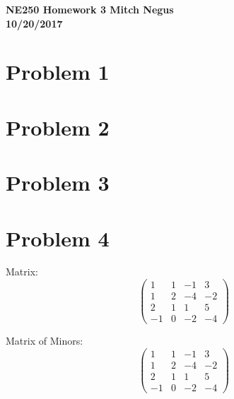 \documentclass{article}
\begin{document}
\thispagestyle{empty}

{\bf {\large {NE250 Homework {3} \hfill Mitch Negus\\
		\hspace*{\fill} 10/20/2017\\ }}}
		
		
		

\section*{Problem 1}




\section*{Problem 2}





\section*{Problem 3}





\section*{Problem 4}

\begin{multicols}{2}
Matrix:
$$\begin{pmatrix}
1 	&	1	&	-1	&	3	\\
1	&	2	&	-4	&	-2	\\
2	&	1	&	1	&	5	\\
-1	&	0	&	-2	&	-4	\end{pmatrix}$$

Matrix of Minors:
$$\begin{pmatrix}
1 	&	1	&	-1	&	3	\\
1	&	2	&	-4	&	-2	\\
2	&	1	&	1	&	5	\\
-1	&	0	&	-2	&	-4	\end{pmatrix}$$

\end{multicols}
\end{document}

